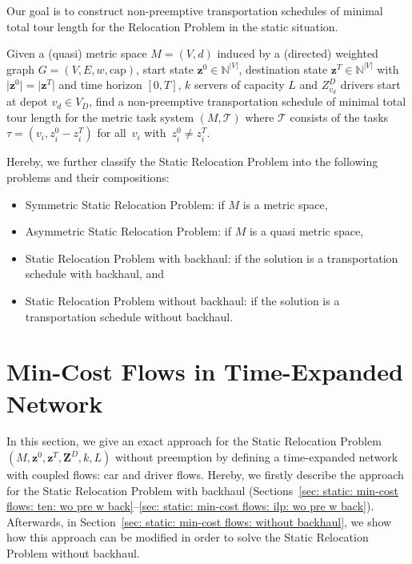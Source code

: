 \documentclass[english]{llncs}
\numberwithin{sublemma}{lemma}
\newcommand{\abs}[1]{\ensuremath{\lvert #1 \rvert}}
\newcommand{\NN}{\ensuremath{\mathbb{N}}}
\newcommand{\dist}{\ensuremath{d}}
\newcommand{\T}{\ensuremath{\mathcal{T}}}
\newcommand{\capacity}{\ensuremath{\text{cap}}}
\newcommand{\z}{\boldsymbol{z}}
\newcommand{\zd}{\boldsymbol{Z}^D} \newcommand{\zzd}{Z^D}
\begin{document}
Our goal is to construct non-preemptive transportation schedules of minimal total tour length for the Relocation Problem in the static situation.


\begin{problem}[Static Relocation Problem $(M,\z^0,\z^T,\zd,k,L)$]
Given a (quasi) metric space $M=(V, \dist)$ induced by a (directed) weighted graph $G=(V, E, w, \capacity)$,
start state $\z^0 \in \NN^{|V|}$, destination state $\z^T \in \NN^{|V|}$ with $\abs{\z^0} = \abs{\z^T}$ and time horizon $[0,T]$, $k$ servers of capacity $L$ and $\zzd_{v_d}$ drivers start at depot $v_d \in V_D$,
find a non-preemptive transportation schedule of minimal total tour length for the metric task system $(M, \T)$ where $\T$ consists of the tasks $\tau = (v_i, z_i^0-z_i^T)$ for all~$v_i$ with~$z_i^0 \neq z_i^T$.

Hereby, we further classify the Static Relocation Problem into the following problems and their compositions:
\begin{itemize}
 \item Symmetric Static Relocation Problem: if $M$ is a metric space,
 \item Asymmetric Static Relocation Problem: if $M$ is a quasi metric space,
 \item Static Relocation Problem with backhaul: if the solution is a transportation schedule with backhaul, and
 \item Static Relocation Problem without backhaul: if the solution is a transportation schedule without backhaul.
\end{itemize}
\end{problem}






\section{Min-Cost Flows in Time-Expanded Network}
\label{sec: static: min-cost flows: wo pre w back}


In this section, we give an exact approach for the Static Relocation Problem $(M,\z^0,\z^T, \zd, k,L)$ without preemption by defining a time-expanded network with coupled flows: car and driver flows.
Hereby, we firstly describe the approach for the Static Relocation Problem with backhaul (Sections~\ref{sec: static: min-cost flows: ten: wo pre w back}--\ref{sec: static: min-cost flows: ilp: wo pre w back}).
Afterwards, in Section~\ref{sec: static: min-cost flows: without backhaul}, we show how this approach can be modified in order to solve the Static Relocation Problem without backhaul.
\end{document}

